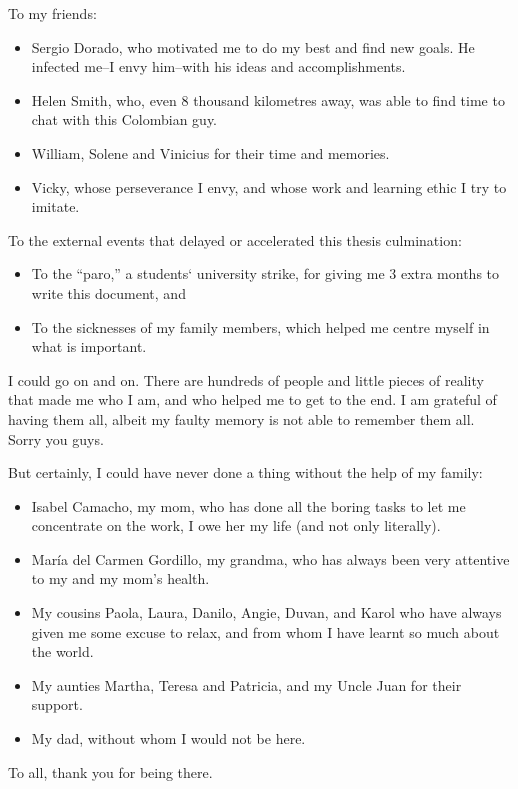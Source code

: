 \begin{acknowledgements}
To my friends:

\begin{itemize}
\tightlist
\item Sergio Dorado, who motivated me to do my best and find new goals. He infected me--I
  envy him--with his ideas and accomplishments.
\item Helen Smith, who, even 8 thousand kilometres away, was able to find time to chat
  with this Colombian guy.
\item William, Solene and Vinicius for their time and memories.
\item Vicky, whose perseverance I envy, and whose work and learning ethic I try to imitate.
\end{itemize}

To the external events that delayed or accelerated this thesis culmination:

\begin{itemize}
\tightlist
\item To the \enquote{paro,} a students` university strike, for giving me 3 extra months to
  write this document,  and
\item To the sicknesses of my family members, which helped me centre myself in what is
  important.
\end{itemize}

I could go on and on. There are hundreds of people and little pieces of
reality that made me who I am, and who helped me to get to the end. I am
grateful of having them all, albeit my faulty memory is not able to remember them all.
Sorry you guys.

But certainly, I could have never done a thing without the help of my
family:

\begin{itemize}
\tightlist
\item Isabel Camacho, my mom, who has done all the boring tasks to let me concentrate
  on the work, I owe her my life (and not only literally).
\item María del Carmen Gordillo, my grandma, who has always been very attentive to my and
  my mom's health.
\item My cousins Paola, Laura, Danilo, Angie, Duvan, and Karol who have always given me
  some excuse to relax, and from whom I have learnt so much about the world.
\item My aunties Martha, Teresa and Patricia, and my Uncle Juan for their support.
\item My dad, without whom I would not be here.
\end{itemize}

To all, thank you for being there.

\end{acknowledgements}
